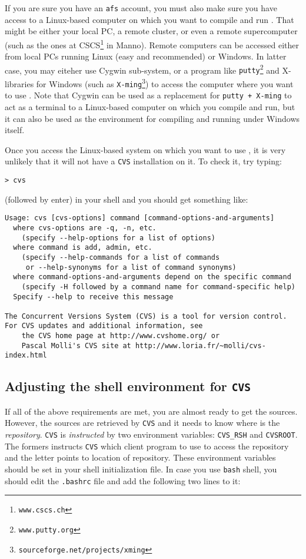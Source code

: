 If you are sure you have an {\tt afs} account, you must also make sure you
have access to a Linux-based computer on which you want to compile 
and run {\psiboil}. That might be either your local PC, a remote cluster, 
or even a remote supercomputer (such as the ones at CSCS\footnote{\tt www.cscs.ch} 
in Manno). 
Remote computers can be accessed either from local PCs running Linux 
(easy and recommended) or Windows. In latter case, you may eiteher use
Cygwin sub-system, or a
program like {\tt putty\footnote{\tt www.putty.org}} and X-libraries for Windows 
(such as {\tt X-ming\footnote{\tt sourceforge.net/projects/xming}}) to
access the computer where you want to use {\psiboil}. Note that Cygwin can
be used as a replacement for {\tt putty + X-ming} to act as a terminal
to a Linux-based computer on which you compile and run, but it can also
be used as the environment for compiling and running under Windows itself. 

Once you access the Linux-based system on which you want to use {\psiboil},
it is very unlikely that it will not have a {\tt CVS} installation on it. 
To check it, try typing:
%
\begin{verbatim}
> cvs
\end{verbatim}
%
(followed by enter) in your shell and you should get something like:
%
{\small \begin{verbatim}
Usage: cvs [cvs-options] command [command-options-and-arguments]
  where cvs-options are -q, -n, etc.
    (specify --help-options for a list of options)
  where command is add, admin, etc.
    (specify --help-commands for a list of commands
     or --help-synonyms for a list of command synonyms)
  where command-options-and-arguments depend on the specific command
    (specify -H followed by a command name for command-specific help)
  Specify --help to receive this message

The Concurrent Versions System (CVS) is a tool for version control.
For CVS updates and additional information, see
    the CVS home page at http://www.cvshome.org/ or
    Pascal Molli's CVS site at http://www.loria.fr/~molli/cvs-index.html
\end{verbatim}}

\subsection{Adjusting the shell environment for {\tt CVS}}

If all of the above requirements are met, you are almost ready to get
the sources. However, the sources are retrieved by {\tt CVS} and it needs to
know where is the {\em repository}. {\tt CVS} is {\em instructed} by two 
environment variables: {\tt CVS\_RSH} and {\tt CVSROOT}. The formers instructs
{\tt CVS} which client program to use to access the repository and the letter
points to location of repository. These environment variables should be set 
in your shell initialization file. In case you use {\tt bash} shell, you should
edit the {\tt .bashrc} file and add the following two lines to it:

